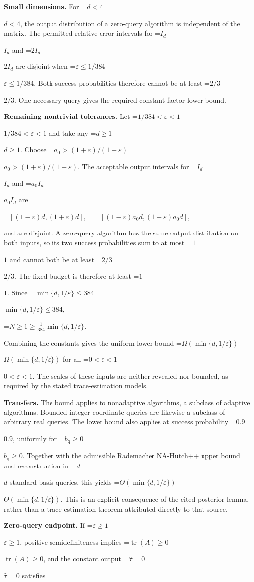 \documentclass[10pt,a4paper]{article}
\newcommand{\AtlasMath}[1]{\par\begingroup\centering\setbox0=\hbox{$\displaystyle #1$}\ifdim\wd0>1.4\linewidth\typeout{ATLAS WIDE FORMULA: \the\wd0}\fi\ifdim\wd0>\linewidth\resizebox{\linewidth}{!}{\box0}\else\box0\fi\par\endgroup}
\newcommand{\AtlasInlineMath}[1]{\begingroup\setbox0=\hbox{$#1$}\ifdim\wd0>.4\linewidth\endgroup\AtlasMath{#1}\else\endgroup$#1$\fi}
\begin{document}
\textbf{Small dimensions.} For \AtlasInlineMath{d<4}, the output distribution of a zero-query algorithm is independent of the matrix. The permitted relative-error intervals for \AtlasInlineMath{I_d} and \AtlasInlineMath{2I_d} are disjoint when \AtlasInlineMath{\varepsilon\le1/384}. Both success probabilities therefore cannot be at least \AtlasInlineMath{2/3}. One necessary query gives the required constant-factor lower bound.

\textbf{Remaining nontrivial tolerances.} Let \AtlasInlineMath{1/384<\varepsilon<1} and take any \AtlasInlineMath{d\ge1}. Choose \AtlasInlineMath{a_0>(1+\varepsilon)/(1-\varepsilon)}. The acceptable output intervals for \AtlasInlineMath{I_d} and \AtlasInlineMath{a_0I_d} are

\AtlasMath{[(1-\varepsilon)d,(1+\varepsilon)d],\qquad [(1-\varepsilon)a_0d,(1+\varepsilon)a_0d],}

and are disjoint. A zero-query algorithm has the same output distribution on both inputs, so its two success probabilities sum to at most \AtlasInlineMath{1} and cannot both be at least \AtlasInlineMath{2/3}. The fixed budget is therefore at least \AtlasInlineMath{1}. Since \AtlasInlineMath{\min\{d,1/\varepsilon\}\le384},

\AtlasMath{N\ge1\ge\frac1{384}\min\{d,1/\varepsilon\}.}

Combining the constants gives the uniform lower bound \AtlasInlineMath{\Omega(\min\{d,1/\varepsilon\})} for all \AtlasInlineMath{0<\varepsilon<1}. The scales of these inputs are neither revealed nor bounded, as required by the stated trace-estimation models.

\textbf{Transfers.} The bound applies to nonadaptive algorithms, a subclass of adaptive algorithms. Bounded integer-coordinate queries are likewise a subclass of arbitrary real queries. The lower bound also applies at success probability \AtlasInlineMath{0.9}, uniformly for \AtlasInlineMath{b_{\mathrm q}\ge0}. Together with the admissible Rademacher NA-Hutch++ upper bound and reconstruction in \AtlasInlineMath{d} standard-basis queries, this yields \AtlasInlineMath{\Theta(\min\{d,1/\varepsilon\})}. This is an explicit consequence of the cited posterior lemma, rather than a trace-estimation theorem attributed directly to that source.

\textbf{Zero-query endpoint.} If \AtlasInlineMath{\varepsilon\ge1}, positive semidefiniteness implies \AtlasInlineMath{\operatorname{tr}(A)\ge0}, and the constant output \AtlasInlineMath{\widehat\tau=0} satisfies
\end{document}
